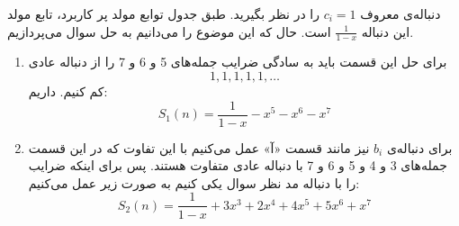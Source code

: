     \p
    دنباله‌ی معروف 
    $c_i = 1$
    را در نظر بگیرید. طبق جدول توابع مولد پر کاربرد، تابع مولد این دنباله
    $\frac{1}{1-x}$
    است.
حال که این موضوع را می‌دانیم به حل سوال می‌پردازیم.
\begin{enumerate}
    \item 
            برای حل این قسمت باید به سادگی ضرایب جمله‌های 5 و 6 و 7 را از دنباله عادی
            $${1,1,1,1,1,\ldots}$$
            کم کنیم. داریم:
            $$S_{1}(n) = \frac{1}{1-x} - x^5 - x^6 - x^7$$
    \item
            برای دنباله‌ی 
            $b_i$
              نیز مانند قسمت «آ» عمل می‌کنیم با این تفاوت که در این قسمت جمله‌های 3 و 4 و 5 و 6 و 7 با دنباله عادی متفاوت هستند. پس برای اینکه ضرایب را با دنباله مد نظر سوال یکی کنیم به صورت زیر عمل می‌کنیم:
            $$S_{2}(n) = \frac{1}{1-x} + 3x^3 + 2x^4 + 4x^5 + 5x^6 + x^7$$
      
\end{enumerate}